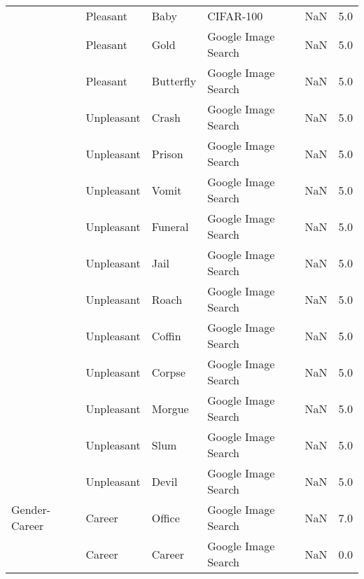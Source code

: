 \begin{tabular}{lllllr}
          & Pleasant &             Baby &            CIFAR-100 &                                                NaN &   5.0 \\
          & Pleasant &             Gold &  Google Image Search &                                                NaN &   5.0 \\
          & Pleasant &        Butterfly &  Google Image Search &                                                NaN &   5.0 \\
          & Unpleasant &            Crash &  Google Image Search &                                                NaN &   5.0 \\
          & Unpleasant &           Prison &  Google Image Search &                                                NaN &   5.0 \\
          & Unpleasant &            Vomit &  Google Image Search &                                                NaN &   5.0 \\
          & Unpleasant &          Funeral &  Google Image Search &                                                NaN &   5.0 \\
          & Unpleasant &             Jail &  Google Image Search &                                                NaN &   5.0 \\
          & Unpleasant &            Roach &  Google Image Search &                                                NaN &   5.0 \\
          & Unpleasant &           Coffin &  Google Image Search &                                                NaN &   5.0 \\
          & Unpleasant &           Corpse &  Google Image Search &                                                NaN &   5.0 \\
          & Unpleasant &           Morgue &  Google Image Search &                                                NaN &   5.0 \\
          & Unpleasant &             Slum &  Google Image Search &                                                NaN &   5.0 \\
          & Unpleasant &            Devil &  Google Image Search &                                                NaN &   5.0 \\
Gender-Career & Career &           Office &  Google Image Search &                                                NaN &   7.0 \\
          & Career &           Career &  Google Image Search &                                                NaN &   0.0 \\

\end{tabular}
